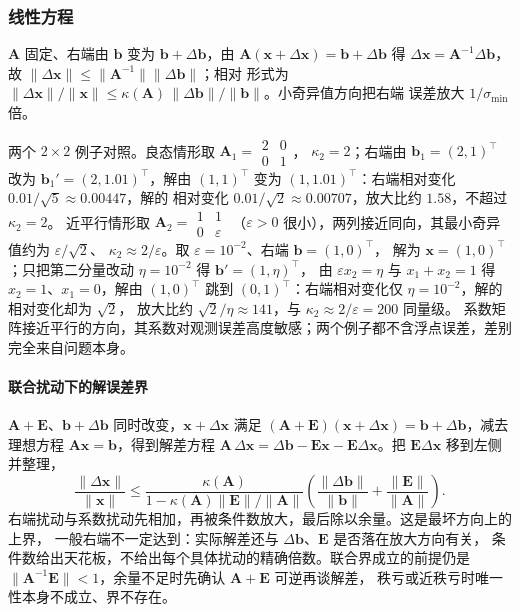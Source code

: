 \subsubsection{线性方程}
\label{sec:ls-linear-system-sensitivity}

$\bm A$ 固定、右端由 $\bm b$ 变为 $\bm b+\Delta\bm b$，由
$\bm A(\bm x+\Delta\bm x)=\bm b+\Delta\bm b$ 得 $\Delta\bm x=\bm A^{-1}\Delta\bm b$，
故 $\lVert\Delta\bm x\rVert\leq\lVert\bm A^{-1}\rVert\lVert\Delta\bm b\rVert$；相对
形式为 $\lVert\Delta\bm x\rVert/\lVert\bm x\rVert
\leq\kappa(\bm A)\,\lVert\Delta\bm b\rVert/\lVert\bm b\rVert$。小奇异值方向把右端
误差放大 $1/\sigma_{\min}$ 倍。

两个 $2\times2$ 例子对照。良态情形取 $\bm A_1=\begin{smallmatrix}2&0\\0&1\end{smallmatrix}$，
$\kappa_2=2$；右端由 $\bm b_1=(2,1)^\top$ 改为 $\bm b_1'=(2,1.01)^\top$，解由
$(1,1)^\top$ 变为 $(1,1.01)^\top$：右端相对变化 $0.01/\sqrt5\approx0.00447$，解的
相对变化 $0.01/\sqrt2\approx0.00707$，放大比约 $1.58$，不超过 $\kappa_2=2$。
近平行情形取 $\bm A_2=\begin{smallmatrix}1&1\\0&\varepsilon\end{smallmatrix}$
（$\varepsilon>0$ 很小），两列接近同向，其最小奇异值约为 $\varepsilon/\sqrt2$、
$\kappa_2\approx2/\varepsilon$。取 $\varepsilon=10^{-2}$、右端 $\bm b=(1,0)^\top$，
解为 $\bm x=(1,0)^\top$；只把第二分量改动 $\eta=10^{-2}$ 得 $\bm b'=(1,\eta)^\top$，
由 $\varepsilon x_2=\eta$ 与 $x_1+x_2=1$ 得 $x_2=1$、$x_1=0$，解由 $(1,0)^\top$
跳到 $(0,1)^\top$：右端相对变化仅 $\eta=10^{-2}$，解的相对变化却为 $\sqrt2$，
放大比约 $\sqrt2/\eta\approx141$，与 $\kappa_2\approx2/\varepsilon=200$ 同量级。
系数矩阵接近平行的方向，其系数对观测误差高度敏感；两个例子都不含浮点误差，差别
完全来自问题本身。

\paragraph{联合扰动下的解误差界}

$\bm A+\bm E$、$\bm b+\Delta\bm b$ 同时改变，$\bm x+\Delta\bm x$ 满足
$(\bm A+\bm E)(\bm x+\Delta\bm x)=\bm b+\Delta\bm b$，减去理想方程
$\bm A\bm x=\bm b$，得到解差方程 $\bm A\,\Delta\bm x=\Delta\bm b-\bm E\bm x
-\bm E\Delta\bm x$。把 $\bm E\Delta\bm x$ 移到左侧并整理，
\begin{equation}
 \frac{\lVert\Delta\bm x\rVert}{\lVert\bm x\rVert}
 \leq
 \frac{\kappa(\bm A)}{1-\kappa(\bm A)\lVert\bm E\rVert/\lVert\bm A\rVert}
 \left(
 \frac{\lVert\Delta\bm b\rVert}{\lVert\bm b\rVert}
 +\frac{\lVert\bm E\rVert}{\lVert\bm A\rVert}
 \right).
 \label{eq:matrix-analysis-linear-system-perturbation}
\end{equation}
右端扰动与系数扰动先相加，再被条件数放大，最后除以余量。这是最坏方向上的上界，
一般右端不一定达到：实际解差还与 $\Delta\bm b$、$\bm E$ 是否落在放大方向有关，
条件数给出天花板，不给出每个具体扰动的精确倍数。联合界成立的前提仍是
$\lVert\bm A^{-1}\bm E\rVert<1$，余量不足时先确认 $\bm A+\bm E$ 可逆再谈解差，
秩亏或近秩亏时唯一性本身不成立、界不存在。

